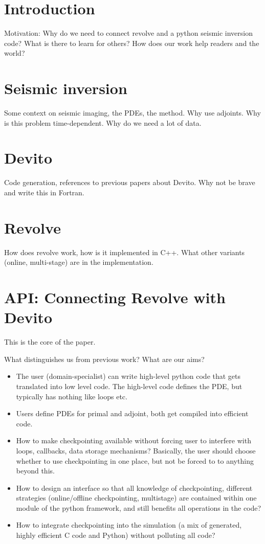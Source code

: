 \documentclass[sigconf]{acmart}
\begin{document}
\section{Introduction}
Motivation: Why do we need to connect revolve and a python seismic inversion code? What is there to learn for others? How does our work help readers and the world?

\section{Seismic inversion}
Some context on seismic imaging, the PDEs, the method. Why use adjoints. Why is this problem time-dependent. Why do we need a lot of data.

\section{Devito}
Code generation, references to previous papers about Devito. Why not be brave and write this in Fortran.

\section{Revolve}
How does revolve work, how is it implemented in C++. What other variants (online, multi-stage) are in the implementation.

\section{API: Connecting Revolve with Devito}
This is the core of the paper.

What distinguishes us from previous work? What are our aims?
\begin{itemize}
\item The user (domain-specialist) can write high-level python code that gets translated into low
level code. The high-level code defines the PDE, but typically has nothing like loops etc.
\item Users define PDEs for primal and adjoint, both get compiled into efficient code.
\item How to make checkpointing available without forcing user to interfere with loops, callbacks,
data storage mechanisms? Basically, the user should choose whether to use checkpointing in one
place, but not be forced to to anything beyond this.
\item How to design an interface so that all knowledge of checkpointing, different strategies
(online/offline checkpointing, multistage) are contained within one module of the python framework,
and still benefits all operations in the code?
\item How to integrate checkpointing into the simulation (a mix of generated, highly efficient C
code and Python) without polluting all code?
\end{itemize}
\end{document}
